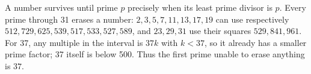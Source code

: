 A number survives until prime $p$ precisely when its least prime divisor is $p$. Every prime through 31 erases a number: $2,3,5,7,11,13,17,19$ can use respectively $512,729,625,539,517,533,527,589$, and $23,29,31$ use their squares $529,841,961$. For 37, any multiple in the interval is $37k$ with $k<37$, so it already has a smaller prime factor; 37 itself is below 500. Thus the first prime unable to erase anything is $\boxed{37}$.
